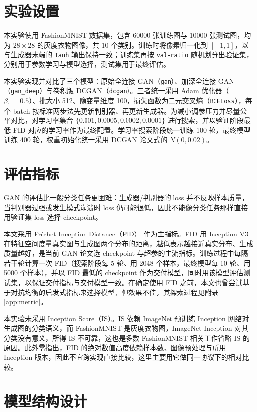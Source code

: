 \documentclass[a4paper]{article}
\begin{document}
\section{实验设置}
本实验使用 FashionMNIST 数据集，包含 60000 张训练图与 10000 张测试图，均为 $28\times28$ 的灰度衣物图像，共 10 个类别。训练时将像素归一化到 $[-1,1]$，以与生成器末端的 \texttt{Tanh} 输出保持一致；训练集再按 \texttt{val-ratio} 随机划分出验证集，分别用于参数学习与模型选择，测试集用于最终评估。

本实验实现并对比了三个模型：原始全连接 GAN（\texttt{gan}）、加深全连接 GAN（\texttt{gan\_deep}）与卷积版 DCGAN（\texttt{dcgan}）。三者统一采用 Adam 优化器（$\beta_1=0.5$）、批大小 512、隐变量维度 100，损失函数为二元交叉熵（\texttt{BCELoss}），每个 batch 按标准两步法先更新判别器、再更新生成器。为减小调参压力并尽量公平对比，对学习率集合 $\{0.001, 0.0005, 0.0002, 0.0001\}$ 进行搜索，并以验证阶段最低 FID 对应的学习率作为最终配置。学习率搜索阶段统一训练 100 轮，最终模型训练 400 轮，权重初始化统一采用 DCGAN 论文式的 $N(0,0.02)$。

\section{评估指标}
\label{sec:eval}
GAN 的评估比一般分类任务更困难：生成器/判别器的 loss 并不反映样本质量，当判别器过强或发生模式崩溃时 loss 仍可能很低，因此不能像分类任务那样直接用验证集 loss 选择 checkpoint。

本文采用 Fréchet Inception Distance（FID）\cite{heusel2017fid} 作为主指标。FID 用 Inception-V3 在特征空间度量真实图与生成图两个分布的距离，越低表示越接近真实分布、生成质量越好，是当前 GAN 论文选 checkpoint 与超参的主流指标。训练过程中每隔若干轮计算一次 FID（搜索阶段每 5 轮、用 2048 个样本，最终模型每 10 轮、用 5000 个样本），并以 FID 最低的 checkpoint 作为交付模型，同时用该模型评估测试集，以保证交付指标与交付模型一致。在确定使用 FID 之前，本文也曾尝试基于对抗均衡的启发式指标来选择模型，但效果不佳，其探索过程见附录 \ref{app:metric}。

本实验未采用 Inception Score（IS）。IS 依赖 ImageNet 预训练 Inception 网络对生成图的分类语义，而 FashionMNIST 是灰度衣物图，ImageNet-Inception 对其分类没有意义，所得 IS 不可靠，这也是多数 FashionMNIST 相关工作省略 IS 的原因\cite{salimans2016is}。此外需指出，FID 的绝对数值高度依赖样本数、图像预处理与所用 Inception 版本，因此不宜跨实现直接比较，这里主要用它做同一协议下的相对比较。

\section{模型结构设计}
\end{document}
